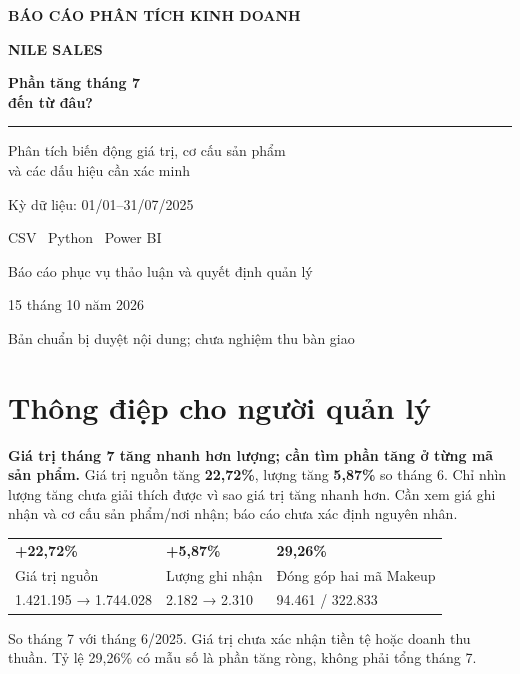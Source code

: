 \documentclass[11pt,a4paper]{article}
\let\originalsection\section
\renewcommand{\section}{\Needspace{5\baselineskip}\originalsection}
\begin{document}
\color{ink}

\begin{titlepage}
\thispagestyle{empty}
\begingroup\setlength{\fboxsep}{0pt}
\colorbox{mist}{\begin{minipage}[c][246mm][c]{\linewidth}
\centering
{\small\bfseries\color{deep}BÁO CÁO PHÂN TÍCH KINH DOANH\par}
\vspace{12mm}
{\fontsize{32}{37}\selectfont\bfseries NILE SALES\par}
\vspace{5mm}
{\fontsize{23}{29}\selectfont\bfseries Phần tăng tháng 7\\đến từ đâu?\par}
\vspace{14mm}
{\color{purple}\rule{105mm}{2pt}}\par
\vspace{12mm}
{\large Phân tích biến động giá trị, cơ cấu sản phẩm\\và các dấu hiệu cần xác minh\par}
\vspace{13mm}
{\large Kỳ dữ liệu: 01/01–31/07/2025\par}
\vspace{12mm}
{\large CSV \textbullet\ Python \textbullet\ Power BI\par}
\vspace{18mm}
{\normalsize Báo cáo phục vụ thảo luận và quyết định quản lý\par}
\vspace{4mm}
{\normalsize 15 tháng 10 năm 2026\par}
\vspace{4mm}
{\small Bản chuẩn bị duyệt nội dung; chưa nghiệm thu bàn giao\par}
\end{minipage}}
\endgroup
\end{titlepage}
\setcounter{page}{2}

\section*{Thông điệp cho người quản lý}
\textbf{Giá trị tháng 7 tăng nhanh hơn lượng; cần tìm phần tăng ở từng mã sản phẩm.}
Giá trị nguồn tăng \textbf{22,72\%}, lượng tăng \textbf{5,87\%} so tháng 6. Chỉ nhìn lượng tăng chưa giải thích được vì sao giá trị tăng nhanh hơn. Cần xem giá ghi nhận và cơ cấu sản phẩm/nơi nhận; báo cáo chưa xác định nguyên nhân.

\begin{tabularx}{\linewidth}{@{}YYY@{}}
\toprule
{\Large\bfseries +22,72\%} & {\Large\bfseries +5,87\%} & {\Large\bfseries\textcolor{deep}{29,26\%}} \\
Giá trị nguồn & Lượng ghi nhận & Đóng góp hai mã Makeup \\
1.421.195 → 1.744.028 & 2.182 → 2.310 & 94.461 / 322.833 \\
\bottomrule
\end{tabularx}
{\footnotesize\color{muted}So tháng 7 với tháng 6/2025. Giá trị chưa xác nhận tiền tệ hoặc doanh thu thuần. Tỷ lệ 29,26\% có mẫu số là phần tăng ròng, không phải tổng tháng 7.\par}
\end{document}
